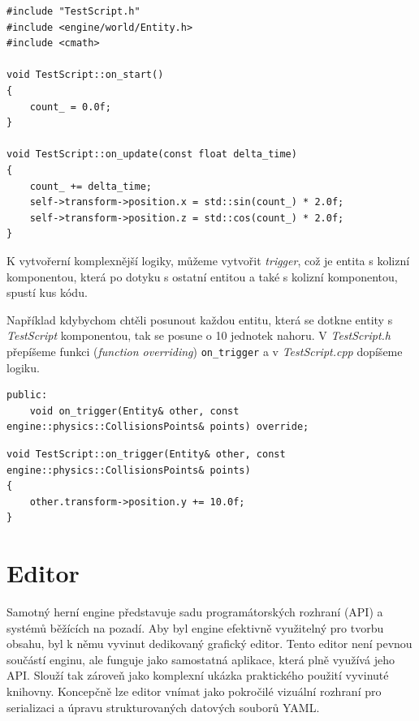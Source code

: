 \documentclass[12pt,a4paper]{article}
\begin{document}
\begin{lstlisting}[caption={Rotace objektu v skriptu TestScript.cpp}]
#include "TestScript.h"
#include <engine/world/Entity.h>
#include <cmath>

void TestScript::on_start()
{
    count_ = 0.0f;
}

void TestScript::on_update(const float delta_time)
{
    count_ += delta_time;
    self->transform->position.x = std::sin(count_) * 2.0f;
    self->transform->position.z = std::cos(count_) * 2.0f;
}
\end{lstlisting}

K vytvořerní komplexnější logiky, můžeme vytvořit \textit{trigger}, což je entita s kolizní komponentou, která po dotyku s ostatní entitou a také s kolizní komponentou, spustí kus kódu.

Například kdybychom chtěli posunout každou entitu, která se dotkne entity s \textit{TestScript} komponentou, tak se posune o 10 jednotek nahoru. V \textit{TestScript.h} přepíšeme funkci (\textit{function overriding}) \texttt{on\_trigger} a v \textit{TestScript.cpp} dopíšeme logiku.

\begin{lstlisting}[caption={Přidání on\_trigger v TestScript.h}]
public:
    void on_trigger(Entity& other, const engine::physics::CollisionsPoints& points) override;
\end{lstlisting}

\begin{lstlisting}[caption={Logika on\_trigger v TestScript.cpp}]
void TestScript::on_trigger(Entity& other, const engine::physics::CollisionsPoints& points)
{
    other.transform->position.y += 10.0f;
}
\end{lstlisting}




\section{Editor}

Samotný herní engine představuje sadu programátorských rozhraní (API) a systémů běžících na pozadí. Aby byl engine efektivně využitelný pro tvorbu obsahu, byl k němu vyvinut dedikovaný grafický editor. Tento editor není pevnou součástí enginu, ale funguje jako samostatná aplikace, která plně využívá jeho API. Slouží tak zároveň jako komplexní ukázka praktického použití vyvinuté knihovny. Koncepčně lze editor vnímat jako pokročilé vizuální rozhraní pro serializaci a úpravu strukturovaných datových souborů YAML.
\end{document}
